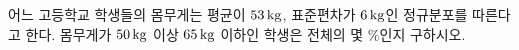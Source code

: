 어느 고등학교 학생들의 몸무게는 평균이 $53\mkern3mu \mathrm{kg}$, 표준편차가 $6\mkern3mu \mathrm{kg}$인 정규분포를 따른다고 한다. 몸무게가 $50\mkern3mu \mathrm{kg}$ 이상 $65\mkern3mu \mathrm{kg}$ 이하인 학생은 전체의 몇 $\%$인지 구하시오. 
